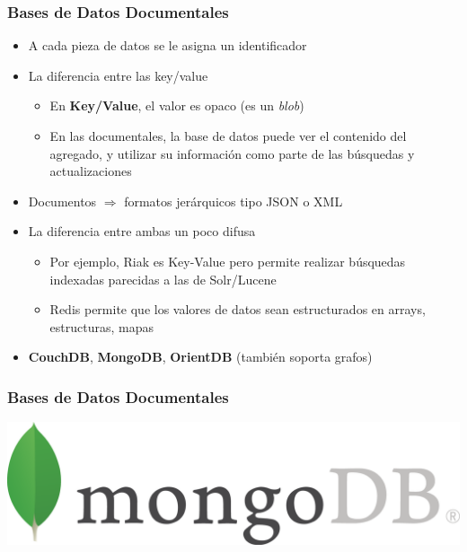 \documentclass[14pt]{beamer}
\begin{document}
\begin{frame}[allowframebreaks]
  \frametitle{Bases de Datos Documentales}
\vspace*{-.9em}
\begin{itemize}
\item A cada pieza de datos se le asigna un identificador
\item La diferencia entre las key/value
  \begin{itemize}
  \item En {\bf Key/Value}, el valor es opaco (es un {\em blob\/})
  \item En las documentales, la base de datos puede ver el contenido del
    agregado, y utilizar su información como parte de las búsquedas y
    actualizaciones
\end{itemize}
\item Documentos $\Rightarrow$ formatos jerárquicos tipo JSON o XML
\framebreak
\item La diferencia entre ambas un poco difusa
  \begin{itemize}
  \item Por ejemplo, Riak es Key-Value pero permite realizar búsquedas
    indexadas parecidas a las de Solr/Lucene
\item Redis permite que los valores de datos sean estructurados en arrays,
  estructuras, mapas
  \end{itemize}
\item {\bf CouchDB}, {\bf MongoDB}, {\bf OrientDB} (también soporta grafos)
\end{itemize}
\end{frame}

\begin{frame}
  \frametitle{Bases de Datos Documentales}
  \includegraphics[width=\textwidth]{img/MongoDB}
\end{frame}
\end{document}
